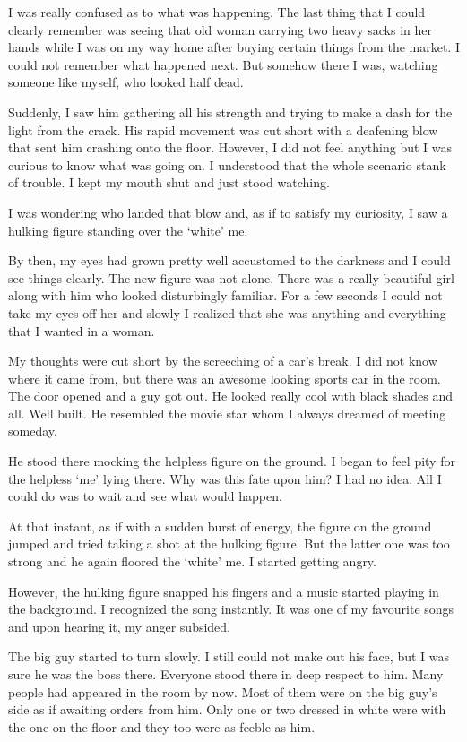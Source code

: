 \documentclass[twoside,11pt,titlepage]{article}
\begin{document}
I was really confused as to what was happening. The last thing that I could clearly remember was seeing that old woman carrying two heavy sacks in her hands while I was on my way home after buying certain things from the market. I could not remember what happened next. But somehow there I was, watching someone like myself, who looked half dead.

Suddenly, I saw him gathering all his strength and trying to make a dash for the light from the crack. His rapid movement was cut short with a deafening blow that sent him crashing onto the floor. However, I did not feel anything but I was curious to know what was going on. I understood that the whole scenario stank of trouble. I kept my mouth shut and just stood watching.

I was wondering who landed that blow and, as if to satisfy my curiosity, I saw a hulking figure standing over the `white' me.

By then, my eyes had grown pretty well accustomed to the darkness and I could see things clearly. The new figure was not alone. There was a really beautiful girl along with him who looked disturbingly familiar. For a few seconds I could not take my eyes off her and slowly I realized that she was anything and everything that I wanted in a woman.

My thoughts were cut short by the screeching of a car's break. I did not know where it came from, but there was an awesome looking sports car in the room. The door opened and a guy got out. He looked really cool with black shades and all. Well built. He resembled the movie star whom I always dreamed of meeting someday.

He stood there mocking the helpless figure on the ground. I began to feel pity for the helpless `me' lying there. Why was this fate upon him? I had no idea. All I could do was to wait and see what would happen.

At that instant, as if with a sudden burst of energy, the figure on the ground jumped and tried taking a shot at the hulking figure. But the latter one was too strong and he again floored the `white' me. I started getting angry.

However, the hulking figure snapped his fingers and a music started playing in the background. I recognized the song instantly. It was one of my favourite songs and upon hearing it, my anger subsided.

The big guy started to turn slowly. I still could not make out his face, but I was sure he was the boss there. Everyone stood there in deep respect to him. Many people had appeared in the room by now. Most of them were on the big guy's side as if awaiting orders from him. Only one or two dressed in white were with the one on the floor and they too were as feeble as him.
\end{document}
